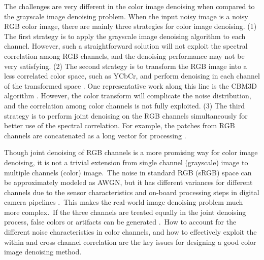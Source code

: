 The challenges are very different in the color image denoising when compared to the grayscale image denoising problem. When the input noisy image is a noisy RGB color image, there are mainly three strategies for color image denoising. (1) The first strategy is to apply the grayscale image denoising algorithm to each channel. However, such a straightforward solution will not exploit the spectral correlation among RGB channels, and the denoising performance may not be very satisfying. (2) The second strategy is to transform the RGB image into a less correlated color space, such as YCbCr, and perform denoising in each channel of the transformed space \cite{foe,cbm3d}. One representative work along this line is the CBM3D algorithm \cite{cbm3d}. However, the color transform will complicate the noise distribution, and the correlation among color channels is not fully exploited. (3) The third strategy is to perform joint denoising on the RGB channels simultaneously for better use of the spectral correlation. For example, the patches from RGB channels are concatenated as a long vector for processing \cite{mairal2008sparse,Zhu_2016_CVPR}.

Though joint denoising of RGB channels is a more promising way for color image denoising, it is not a trivial extension from single channel (grayscale) image to multiple channels (color) image.\ The noise in standard RGB (sRGB) space can be approximately modeled as AWGN, but it has different variances for different channels \cite{Liu2008,Leungtip,crosschannel2016} due to the sensor characteristics and on-board processing steps in digital camera pipelines \cite{crosschannel2016,karaimer_brown_ECCV_2016}.\ This makes the real-world image denoising problem much more complex.\ If the three channels are treated equally in the joint denoising process, false colors or artifacts can be generated \cite{mairal2008sparse}.\ How to account for the different noise characteristics in color channels, and how to effectively exploit the within and cross channel correlation are the key issues for designing a good color image denoising method.

